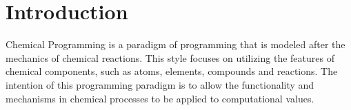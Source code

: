 
\section{Introduction}

Chemical Programming is a paradigm of programming that is modeled after the mechanics of chemical reactions. This style focuses on utilizing the features of chemical components, such as atoms, elements, compounds and reactions. The intention of this programming paradigm is to allow the functionality and mechanisms in chemical processes to be applied to computational values.